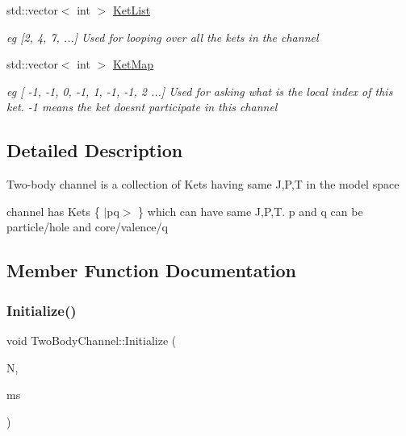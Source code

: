 \begin{DoxyCompactItemize}
\mbox{\label{classTwoBodyChannel_a55bbd64549b0c39c019eb28f6a8809ac}} 
std\+::vector$<$ int $>$ \hyperlink{classTwoBodyChannel_a55bbd64549b0c39c019eb28f6a8809ac}{Ket\+List}
\begin{DoxyCompactList}\small\item\em eg \mbox{[}2, 4, 7, ...\mbox{]} Used for looping over all the kets in the channel \end{DoxyCompactList}\item 
\mbox{\label{classTwoBodyChannel_a5d353c3236f6b6067d51b9213be5e127}} 
std\+::vector$<$ int $>$ \hyperlink{classTwoBodyChannel_a5d353c3236f6b6067d51b9213be5e127}{Ket\+Map}
\begin{DoxyCompactList}\small\item\em eg \mbox{[} -\/1, -\/1, 0, -\/1, 1, -\/1, -\/1, 2 ...\mbox{]} Used for asking what is the local index of this ket. -\/1 means the ket doesn\textquotesingle{}t participate in this channel \end{DoxyCompactList}\end{DoxyCompactItemize}


\subsection{Detailed Description}
Two-\/body channel is a collection of Kets having same J,P,T in the model space

channel has Kets \{ $\vert$pq$>$ \} which can have same J,P,T. p and q can be particle/hole and core/valence/q 

\subsection{Member Function Documentation}
\mbox{\label{classTwoBodyChannel_abe82c6109a1de6cfe94e8bb88b84cdc2}} 
\subsubsection{\texorpdfstring{Initialize()}{Initialize()}}
{\footnotesize\ttfamily void Two\+Body\+Channel\+::\+Initialize (\begin{DoxyParamCaption}\item[{int}]{N,  }\item[{\hyperlink{classModelSpace}{Model\+Space} $\ast$}]{ms }\end{DoxyParamCaption})}

